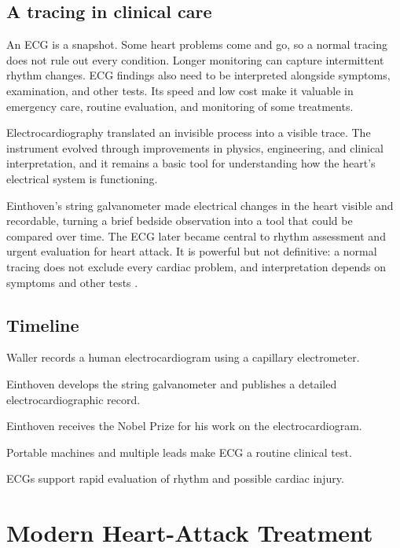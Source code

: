 \documentclass[12pt,oneside]{book}
\begin{document}
\section{A tracing in clinical care}
An ECG is a snapshot. Some heart problems come and go, so a normal tracing
does not rule out every condition. Longer monitoring can capture
intermittent rhythm changes. ECG findings also need to be interpreted
alongside symptoms, examination, and other tests. Its speed and low cost
make it valuable in emergency care, routine evaluation, and monitoring of
some treatments.

Electrocardiography translated an invisible process into a visible trace.
The instrument evolved through improvements in physics, engineering, and
clinical interpretation, and it remains a basic tool for understanding
how the heart's electrical system is functioning.

Einthoven’s string galvanometer made electrical changes in the heart visible
and recordable, turning a brief bedside observation into a tool that could be
compared over time. The ECG later became central to rhythm assessment and
urgent evaluation for heart attack. It is powerful but not definitive: a
normal tracing does not exclude every cardiac problem, and interpretation
depends on symptoms and other tests \cite{einthovenECGHistory}.

\section*{Timeline}
\begin{description}[leftmargin=2.3cm,style=nextline]
  \item[1887] Waller records a human electrocardiogram using a capillary electrometer.
  \item[1903] Einthoven develops the string galvanometer and publishes a detailed electrocardiographic record.
  \item[1924] Einthoven receives the Nobel Prize for his work on the electrocardiogram.
  \item[Twentieth century] Portable machines and multiple leads make ECG a routine clinical test.
  \item[Today] ECGs support rapid evaluation of rhythm and possible cardiac injury.
\end{description}
\chapter[Modern Heart-Attack Treatment]{Modern Heart-Attack Treatment}
\end{document}
